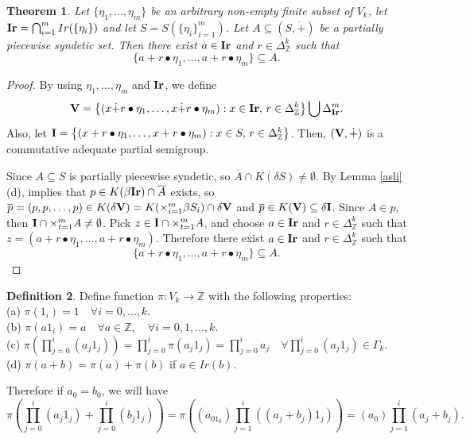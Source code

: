 \documentclass{amsart}
\newtheorem{theorem}{Theorem}[section]
\theoremstyle{definition}
\newtheorem{definition}[theorem]{Definition}
\theoremstyle{remark}
\numberwithin{equation}{section}
\newcommand{\Ir}{{\bf{Ir}}}
\newcommand{\V}{{\bf{V}}}
\newcommand{\I}{{\bf{I}}}
\begin{document}
\begin{theorem}{\label{5.9}}
	Let $\{\eta_1,\ldots,\eta_m\}$ be an arbitrary non-empty finite subset of $V_k$, let $\Ir=\bigcap_{i=1}^m Ir(\{\eta_i\})$ and let $S=S(\{\eta_i\}_{i=1}^m)$. Let  $A\subseteq (S,\dot{+})$ be a partially piecewise syndetic set. Then there exist \( a \in \Ir \) and \( r\in \Delta_{\mathbb{Z}}^k \) such that  
	\[
	\{ a + r\bullet \eta_1, \ldots, a + r\bullet \eta_m \}\subseteq A.
	\] 
\end{theorem}
\begin{proof}
	
	By using \(\eta_1, \ldots, \eta_m\) and \(\Ir\), we define    
	\[
	\V = \left\{ \left(x\dot{ +} r \bullet \eta_1, \ldots, x \dot{+} r \bullet \eta_m \right) : x \in \Ir,\,r \in \Delta_{\mathbb{Z}}^k \right\}\bigcup \Delta_\Ir^m.
	\]
	Also, let $\I=\left\{ \left(x + r \bullet \eta_1, \ldots, x + r \bullet \eta_m \right) : x \in S,\,r \in \Delta_{\mathbb{Z}}^k\right\}$. Then, $(\V, \dot{+})$ is a commutative adequate partial semigroup.
	
	Since $A\subseteq S$ is partially piecewise syndetic, so $\overline{A}\cap K(\delta S)\neq\emptyset$. By Lemma \ref{asli}(d), implies that  \( p \in K(\beta\Ir)\cap \overline{A}\) exists, so \(\overline{ p} = (p, p, \ldots, p) \in K(\delta \V)=K(\times_{i=1}^m\beta S_i)\cap\delta \V \) and \( \overline{p} \in K(\V) \subseteq \delta \I \). Since $A\in p$, then \( \I \cap \times_{t=1}^{m} A \neq \emptyset \). Pick \( z \in \I \cap \times_{t=1}^{m} A \), and choose \( a \in \Ir \) and \( r\in \Delta_{\mathbb{Z}}^k \) such that $z = \left( a + r\bullet \eta_1, \dots, a + r\bullet \eta_m \right)$. Therefore  there exist \( a \in \Ir \) and \( r\in \Delta_{\mathbb{Z}}^k \) such that
	\[
	\{a + r\bullet \eta_1, \dots, a + r\bullet \eta_m \}\subseteq A.
	\]
\end{proof}



\begin{definition}{\label{pi}}
Define function $\pi:V_k\to \mathbb{Z}$ with the following properties:\\
	(a) \(\pi(1_i) = 1 \quad \forall i=0,\ldots,k\).\\
	(b)	\(\pi(a1_i) = a \quad \forall a\in \mathbb{Z}, \quad \forall i=0,1,\ldots,k\).\\
(c)	\(\pi(\prod_{j=0}^i (a_j 1_j)) = \prod_{j=0}^i \pi(a_j 1_j)=\prod_{j=0}^i a_j \quad \forall \prod_{j=0}^i (a_j 1_j)\in \Gamma_k\).\\
(d) $\pi(a+b) = \pi(a) + \pi(b)$ if $a\in Ir({b})$.
\end{definition}
	Therefore if $a_0=b_0$, we will have
	\[
	\pi(\prod_{j=0}^i (a_j 1_j)+\prod_{j=0}^i (b_j 1_j))=\pi((a_01_0)\prod_{j=1}^i ((a_j+b_j) 1_j))=(a_0)\prod_{j=1}^i (a_j+b_j).
	\]
\end{document}
